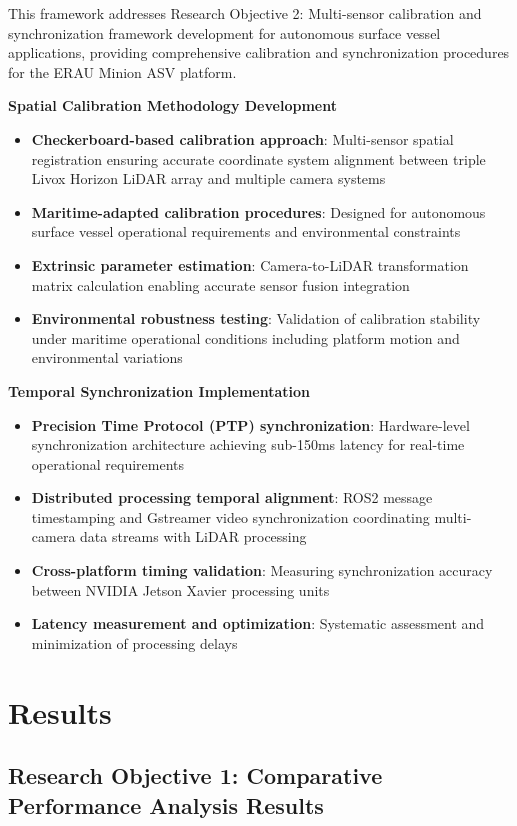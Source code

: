 \documentclass{erauthesis}
\begin{document}
This framework addresses Research Objective 2: Multi-sensor calibration and synchronization framework development for autonomous surface vessel applications, providing comprehensive calibration and synchronization procedures for the ERAU Minion ASV platform.

\textbf{Spatial Calibration Methodology Development}
\begin{itemize}
\item \textbf{Checkerboard-based calibration approach}: Multi-sensor spatial registration ensuring accurate coordinate system alignment between triple Livox Horizon LiDAR array and multiple camera systems
\item \textbf{Maritime-adapted calibration procedures}: Designed for autonomous surface vessel operational requirements and environmental constraints
\item \textbf{Extrinsic parameter estimation}: Camera-to-LiDAR transformation matrix calculation enabling accurate sensor fusion integration
\item \textbf{Environmental robustness testing}: Validation of calibration stability under maritime operational conditions including platform motion and environmental variations
\end{itemize}

\textbf{Temporal Synchronization Implementation}
\begin{itemize}
\item \textbf{Precision Time Protocol (PTP) synchronization}: Hardware-level synchronization architecture achieving sub-150ms latency for real-time operational requirements
\item \textbf{Distributed processing temporal alignment}: ROS2 message timestamping and Gstreamer video synchronization coordinating multi-camera data streams with LiDAR processing
\item \textbf{Cross-platform timing validation}: Measuring synchronization accuracy between NVIDIA Jetson Xavier processing units
\item \textbf{Latency measurement and optimization}: Systematic assessment and minimization of processing delays
\end{itemize}


\chapter{Results}

\section{Research Objective 1: Comparative Performance Analysis Results}
\end{document}
